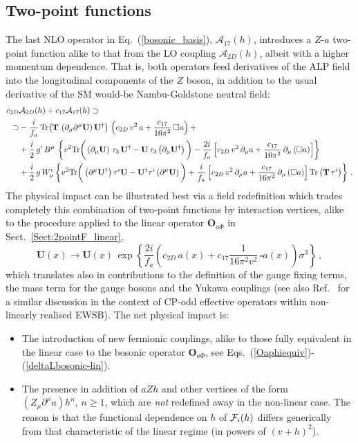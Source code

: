 \documentclass[11pt]{article}
\newcommand{\s}{\sigma}
\newcommand{\A}{\mathcal{A}}
\renewcommand{\O}{\mathbf{O}}
\newcommand{\T}{\mathbf{T}}
\newcommand{\U}{\mathbf{U}}
\newcommand{\tr}{{\rm Tr}}
\renewcommand{\to}{\rightarrow}
\newcommand{\de}{\partial}
\newcommand{\beq}{\begin{equation}}
\newcommand{\eeq}{\end{equation}}
\renewcommand{\[}{\begin{equation}}
\renewcommand{\]}{\end{equation}}
\def\cF{{\cal F}}
\begin{document}
\subsection{Two-point functions}
\label{Sect:2pointF}
The last NLO operator in Eq.~(\ref{bosonic_basis}), $\A_{17}(h)$, introduces a $Z$-$a$ two-point function alike to that from the LO coupling $\A_{2D}(h)$, albeit with a higher momentum dependence. That is, both operators feed derivatives of the ALP field into the longitudinal components of the $Z$ boson, in addition to the usual derivative of the SM would-be Nambu-Goldstone neutral field:   
\begin{equation}
\begin{aligned}
 c_{2D}&\A_{2D}(h)+c_{17}\A_{17}(h) \supset\\ 
 \supset& -\frac{i}{f_a}\,
 \tr\big(\T\,\left(\de_\mu\de^\mu\U\right)\U^\dag\big)\,
 \left(c_{2 D}\,v^2\,a + \frac{c_{17}}{16\pi^2}\, \Box a\right)+ \label{two-point} \\
& +
  \frac{i}{2}\,g'\,B^\mu\,
   \left\{v^2\tr\bigg(\left(\de_\mu\U\right)\,\tau_3\,\U^\dag-\U\,\tau_3 \left(\de_\mu
    \U^\dag\right)\bigg) 
    - \dfrac{2i}{f_a}\left[c_{2D}\,v^2\,\de_\mu a + \frac{c_{17}}{16\pi^2}\,\de_\mu\left(\Box a\right)\right]\right\} \\
&+ \frac{i}{2}\,g\,W^i_\mu
    \left\{v^2\tr\bigg(\left(\de^\mu\U^\dag\right)\tau^i\U-\U^\dag\tau^i \left(\de^\mu\U\right)\bigg) 
    + \frac{i}{f_a}\left[c_{2D}\,v^2\,\de_\mu a
    + \frac{c_{17}}{16\pi^2}\,\de_\mu\left(\Box a\right)\right]\tr\left(\T\,\tau^i\right)\right\}\,.
\end{aligned}
\end{equation}
The physical impact can be illustrated best  via a field redefinition which trades completely 
this combination of two-point functions by interaction vertices, alike to the procedure applied to the linear operator $\O_{a\Phi}$  in Sect.~\ref{Sect:2pointF_linear},
\beq
\U(x) \to \U(x) \,\exp\left\{\frac{2i}{ f_a} \left(c_{2D}\, a(x)+c_{17}\frac{1}{16\pi^2 v^2}\,\square a(x)\right) \s^3\right\}\,,
\label{Eq:Uredef}
\eeq
 which translates also in contributions to the definition of the gauge fixing terms, the mass term for the gauge bosons and  the 
Yukawa couplings (see also Ref.~\cite{Gavela:2014vra} for a similar 
discussion in the context of CP-odd effective operators within non-linearly realised EWSB). The net physical impact is: 
\begin{itemize}
\item  The introduction of new fermionic couplings, alike to those  fully equivalent  in the linear case to the  bosonic  operator $\O_{a\Phi}$, see  Eqs.~(\ref{Oaphiequiv})-(\ref{deltaLbosonic-lin}).
\item The presence in addition of 
$aZh$ and other vertices of the form $(Z_\mu \de^\mu a) h^n,\, n\geq 1$, which are {\it not} redefined away in the non-linear case. The reason is that  the    functional dependence on $h$ of  $\cF_i(h)$ differs generically from that characteristic of the linear regime (in powers of $(v+h)^2$). 
\end{itemize}
\end{document}
